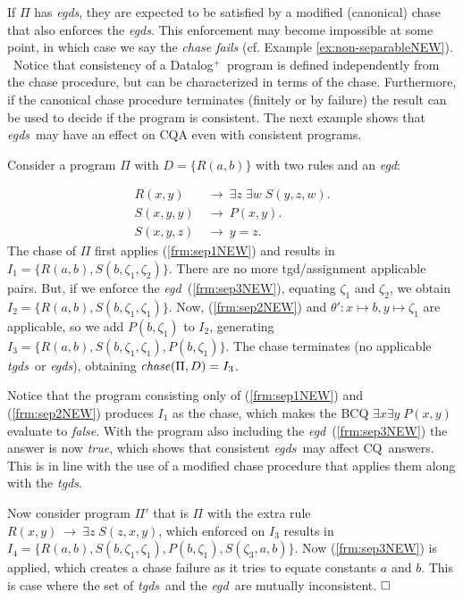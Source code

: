 \documentclass[format=acmsmall, review=false, screen=true]{acmart}
\newcommand{\cq}{CQ}
\newcommand{\boxtheorem}{\ensuremath{\hfill \Box}}
\newcommand{\nit}[1]{{\it #1}}
\newcommand{\prg}{\Pi}
\newcommand{\dplus}{{Datalog}$^+$}
\newcommand{\egds}{{\em egds}}
\newcommand{\egd}{{\em egd}}
\newcommand{\tgds}{{\em tgds}}
\newcommand{\red}[1]{{#1}}
\newcommand{\blue}[1]{{#1}}
\newcommand{\comlb}[1]{{\vspace{2mm}\noindent \bf \blue{COMM(LEO):}}~ #1 \hfill {\bf
    END.}\\}
\newcommand{\commos}[1]{{\vspace{2mm}\noindent \bf \blue{COMM(MOSTAFA):}}~ #1 \hfill {\bf
    END.}\\}
\begin{document}



\blue{If $\Pi$ has \egds, they are  expected to be satisfied by a modified (canonical) chase \cite{cali13} that also enforces the \egds. This enforcement may become impossible at some point, in which case we say the {\em chase fails} (cf. Example \ref{ex:non-separableNEW}).} \
\red{Notice that consistency of a \dplus \ program is defined independently from the chase procedure, but can be characterized in terms of the chase. Furthermore, if the canonical chase procedure terminates (finitely or by failure) the result can be used to decide if the program is consistent.} \blue{The next example shows that \egds \ may have an effect on CQA even with consistent programs.}

\begin{example} \label{ex:non-separableNEW} Consider a program $\prg$ with $\red{D}=\{R(a,b)\}$ with two rules and an \egd:

\vspace{-4mm}
\begin{align}
R(x,y) ~&\rightarrow~ \exists z\; \exists w\;S(y,z,w).\label{frm:sep1NEW}\\
S(x,y,y) ~&\rightarrow~ P(x,y).\label{frm:sep2NEW}\\
S(x,y,z) ~&\rightarrow~ y=z.\label{frm:sep3NEW}
\end{align}
The chase of $\prg$ first applies (\ref{frm:sep1NEW}) and results in $I_1=\{R(a,b),S(b,\zeta_1,\zeta_2)\}$. There are no more tgd/assignment applicable pairs. But, if we enforce the \egd~(\ref{frm:sep3NEW}), equating $\zeta_1$ and $\zeta_2$, we obtain $I_2=\{R(a,b),S(b,\zeta_1,\zeta_1)\}$.  Now, (\ref{frm:sep2NEW}) and $\theta': x\mapsto b, y\mapsto \zeta_1$ are applicable, so we add $P(b,\zeta_1)$ to $I_2$, generating $I_3=\{R(a,b),S(b,\zeta_1,\zeta_1),P(b,\zeta_1)\}$.
The chase terminates (no applicable \tgds \ or \egds), obtaining $\nit{chase}(\prg,\red{D}) = I_3$.

Notice that the program consisting only of (\ref{frm:sep1NEW}) and (\ref{frm:sep2NEW}) produces $I_1$ as the chase, which makes the BCQ $\exists x \exists y\;P(x,y)$ evaluate to {\em false}. With the program also including the \egd \ (\ref{frm:sep3NEW}) the answer is now {\em true}, \blue{which shows  that consistent \egds \ may affect \cq \ answers. This is in line with the use of a modified chase procedure that applies them along with the \tgds.}


Now consider  program $\prg'$ that is $\prg$ with the extra rule \ $R(x,y) ~\rightarrow~ \exists z\;S(z,x,y)$, which enforced on $I_3$ results in $I_4=\{R(a,b),S(b,\zeta_1,\zeta_1),P(b,\zeta_1),S(\zeta_3,a,b)\}$.
Now (\ref{frm:sep3NEW}) is applied, which creates a chase failure as it tries to equate constants $a$ and $b$. This is case where the set of \tgds \ and the \egd \ are mutually inconsistent. \boxtheorem\end{example}
\end{document}
